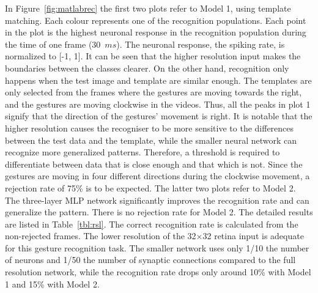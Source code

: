 \documentclass[journal]{journal}
\begin{document}
In Figure~\ref{fig:matlabrec} the first two plots refer to Model 1, using template matching. Each colour represents one of the recognition populations. 
Each point in the plot is the highest neuronal response in the recognition population during the time of one frame (30~$ms$). 
The neuronal response, the spiking rate, is normalized to [-1, 1]. 
It can be seen that the higher resolution input makes the boundaries between the classes clearer. 
On the other hand, recognition only happens when the test image and template are similar enough. 
The templates are only selected from the frames where the gestures are moving towards the right, and the gestures are moving clockwise in the videos. 
Thus, all the peaks in plot 1 signify that the direction of the gestures’ movement is right.  
It is notable that the higher resolution causes the recogniser to be more sensitive to the differences between the test data and the template, while the smaller neural network can recognize more generalized patterns. 
Therefore, a threshold is required to differentiate between data that is close enough and that which is not. 
Since the gestures are moving in four different directions during the clockwise movement, a rejection rate of 75\% is to be expected. 
The latter two plots refer to Model 2. 
The three-layer MLP network significantly improves the recognition rate and can generalize the pattern. 
There is no rejection rate for Model 2. 
The detailed results are listed in  Table~\ref{tbl:rsl}. 
The correct recognition rate is calculated from the non-rejected frames.
The lower resolution of the 32$\times$32 retina input is adequate for this gesture recognition task. 
The smaller network uses only 1/10 the number of neurons and 1/50 the number of synaptic connections compared to the full resolution network, while the recognition rate drops only around 10\% with Model 1 and 15\% with Model 2.
\end{document}
